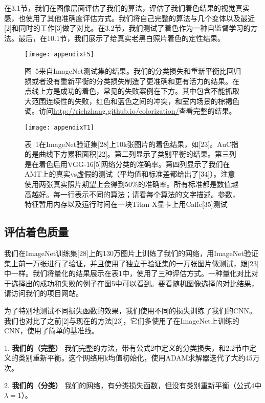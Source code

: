 在3.1节，我们在图像层面评估了我们的算法，评估了我们着色结果的视觉真实感，也使用了其他准确度评估方式。我们将自己完整的算法与几个变体以及最近[2]和同时的工作[3]做了对比。在3.2节，我们测试了着色作为一种自监督学习的方法。最后，在10.1节，我们展示了给真实老黑白照片着色的定性结果。

\begin{figure}[!htb]
  \centering
  \texttt{[image: appendixF5]}
  \caption*{图~5\quad 来自ImageNet测试集的结果。我们的分类损失和重新平衡比回归损或者没有重新平衡的分类损失制造了更准确和更有活力的结果。在点线上方是成功的着色，常见的失败案例在下方。其中包含不能抓取大范围连续性的失败，红色和蓝色之间的冲突，和室内场景的棕褐色调。访问\url{http://richzhang.github.io/colorization/}查看完整的结果。}
  \label{tab:badfigure5}
\end{figure}

\begin{figure}[h]
  \centering
  \texttt{[image: appendixT1]}
  \caption*{表~1\quad 在ImageNet验证集[28]上10k张图片的着色结果，如[23]。AuC指的是曲线下方累积面积[22]。第二列显示了类别平衡的结果。第三列是在着色后用VGG-16[5]网络分类的准确率。第四列显示了我们在AMT上的真实vs虚假的测试（平均值和标准差都给出了[34]）。注意使用两张真实照片期望上会得到50\%的准确率。所有标准都是数值越高越好。每一行表示不同的算法；请看每个算法的文字描述。参数，特征暂用内存以及运行时间在一块Titan X显卡上用Caffe[35]测试}
  \label{tab:badfigure6}
\end{figure}

\subsection{评估着色质量}

我们在ImageNet训练集[28]上的130万图片上训练了我们的网络，用ImageNet验证集上前一万张进行了验证，并且使用了独立于验证集的一万张图片做测试，跟[23]中一样。我们将量化的结果展示在表1中，使用了三种评估方式。一种量化对比对于选择出的成功和失败的例子在图5中可以看到。要看随机图像选择的对比结果，请访问我们的项目网站。


为了特别地测试不同损失函数的效果，我们使用不同的损失训练了我们的CNN。我们也对比了之前[2]与现在的方法[23]，它们多使用了在ImageNet上训练的CNN，使用了简单的基准线。

1. \textbf{我们的（完整）} 我们完整的方法，带有公式2中定义的分类损失，和2.2节中定义的类别重新平衡。这个网络用k均值初始化，使用ADAM求解器迭代了大约45万次。

2. \textbf{我们的（分类）} 我们的网络，有分类损失函数，但没有类别重新平衡（公式4中$\lambda = 1$）。

